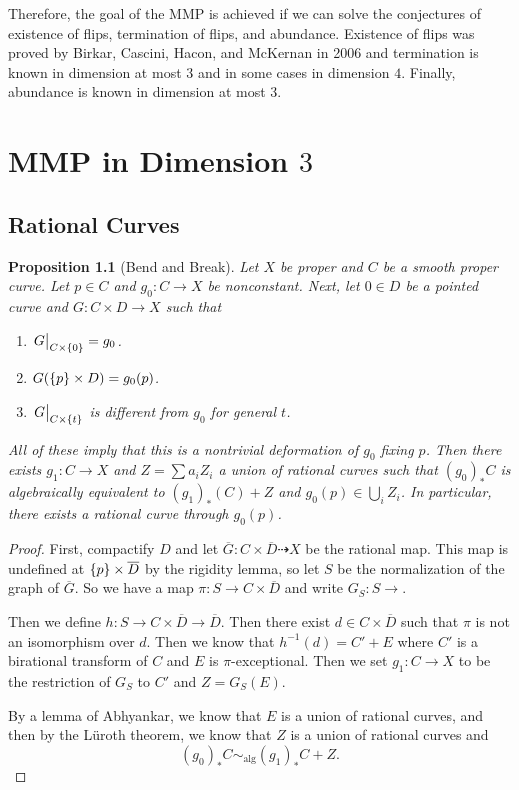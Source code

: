 \documentclass[leqno, openany]{memoir}
\newtheorem{prop}[thm]{Proposition}
\theoremstyle{definition}
\theoremstyle{remark}
\theoremstyle{plain}
\theoremstyle{definition}
\theoremstyle{remark}
\newcommand{\mr}[1]{\mathrm{#1}}
\newcommand{\ol}[1]{\overline{#1}}
\begin{document}
Therefore, the goal of the MMP is achieved if we can solve the conjectures of existence of flips, termination of flips, and abundance. Existence of flips was proved by Birkar, Cascini, Hacon, and McKernan in 2006 and termination is known in dimension at most $3$ and in some cases in dimension $4$. Finally, abundance is known in dimension at most $3$.

\chapter{MMP in Dimension $3$}%
\label{cha:mmp_in_dimension_3_}

\section{Rational Curves}%
\label{sec:bend_and_break}

\begin{prop}[Bend and Break]
    Let $X$ be proper and $C$ be a smooth proper curve. Let $p \in C$ and $g_0 \colon C \to X$ be nonconstant. Next, let $0 \in D$ be a pointed curve and $G \colon C \times D \to X$ such that
    \begin{enumerate}
        \item $\eval{G}_{C \times \qty{0}} = g_0$.
        \item $G(\qty{p} \times D) = g_0(p)$.
        \item $\eval{G}_{C \times \qty{t}}$ is different from $g_0$ for general $t$.
    \end{enumerate}
    All of these imply that this is a nontrivial deformation of $g_0$ fixing $p$. Then there exists $g_1 \colon C \to X$ and $Z = \sum a_i Z_i$ a union of rational curves such that ${(g_0)}_* C$ is algebraically equivalent to ${(g_1)}_* (C) + Z$ and $g_0(p) \in \bigcup_i Z_i$. In particular, there exists a rational curve through $g_0(p)$.
\end{prop}

\begin{proof}
    First, compactify $D$ and let $\ol{G} \colon C \times \ol{D} \dashrightarrow X$ be the rational map. This map is undefined at $\qty{p} \times \ol{D}$ by the rigidity lemma, so let $S$ be the normalization of the graph of $\ol{G}$. So we have a map $\pi \colon S \to C \times \ol{D}$ and write $G_S \colon S \to $. 

    Then we define $h \colon S \to C \times \ol{D} \to \ol{D}$. Then there exist $d \in C \times \ol{D}$ such that $\pi$ is not an isomorphism over $d$. Then we know that $h^{-1}(d) = C' + E$ where $C'$ is a birational transform of $C$ and $E$ is $\pi$-exceptional. Then we set $g_1 \colon C \to X$ to be the restriction of $G_S$ to $C'$ and $Z = G_S(E)$.

    By a lemma of Abhyankar, we know that $E$ is a union of rational curves, and then by the L\"uroth theorem, we know that $Z$ is a union of rational curves and
    \[ {(g_0)}_* C \sim_{\mr{alg}} {(g_1)}_* C + Z. \]
\end{proof}
\end{document}
